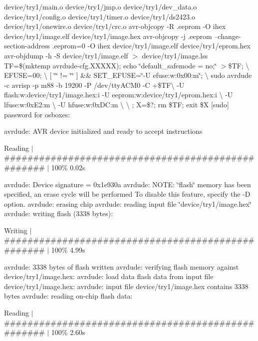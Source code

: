 device/try1/main.\-o device/try1/jmp.\-o device/try1/dev\-\_\-data.\-o device/try1/config.\-o device/try1/timer.\-o device/try1/ds2423.\-o device/try1/onewire.\-o device/try1/crc.\-o avr-\/objcopy -\/\-R .eeprom -\/\-O ihex device/try1/image.\-elf device/try1/image.\-hex avr-\/objcopy -\/j .eeprom --change-\/section-\/address .eeprom=0 -\/\-O ihex device/try1/image.\-elf device/try1/eprom.\-hex avr-\/objdump -\/h -\/\-S device/try1/image.\-elf $>$ device/try1/image.\-lss T\-F=\$(mktemp avrdude-\/cfg.\-X\-X\-X\-X\-X); echo \char`\"{}default\-\_\-safemode = no;\char`\"{} $>$\$\-T\-F; \textbackslash{} E\-F\-U\-S\-E=00; \textbackslash{} \mbox{[} \char`\"{}\char`\"{} != \char`\"{}\char`\"{} \mbox{]} \&\& S\-E\-T\-\_\-\-E\-F\-U\-S\-E=\char`\"{}-\/\-U efuse\-:w\-:0x00\-:m\char`\"{}; \textbackslash{} sudo avrdude -\/c avrisp -\/p m88 -\/b 19200 -\/\-P /dev/tty\-A\-C\-M0 -\/\-C +\$\-T\-F\textbackslash{} -\/\-U flash\-:w\-:device/try1/image.\-hex\-:i -\/\-U eeprom\-:w\-:device/try1/eprom.\-hex\-:i \textbackslash{} -\/\-U lfuse\-:w\-:0x\-E2\-:m \textbackslash{} -\/\-U hfuse\-:w\-:0x\-D\-C\-:m \textbackslash{} \textbackslash{} ; X=\$?; rm \$\-T\-F; exit \$\-X \mbox{[}sudo\mbox{]} password for osboxes\-:

avrdude\-: A\-V\-R device initialized and ready to accept instructions

Reading $\vert$ \#\#\#\#\#\#\#\#\#\#\#\#\#\#\#\#\#\#\#\#\#\#\#\#\#\#\#\#\#\#\#\#\#\#\#\#\#\#\#\#\#\#\#\#\#\#\#\#\#\# $\vert$ 100\% 0.\-02s

avrdude\-: Device signature = 0x1e930a avrdude\-: N\-O\-T\-E\-: \char`\"{}flash\char`\"{} memory has been specified, an erase cycle will be performed To disable this feature, specify the -\/\-D option. avrdude\-: erasing chip avrdude\-: reading input file \char`\"{}device/try1/image.\-hex\char`\"{} avrdude\-: writing flash (3338 bytes)\-:

Writing $\vert$ \#\#\#\#\#\#\#\#\#\#\#\#\#\#\#\#\#\#\#\#\#\#\#\#\#\#\#\#\#\#\#\#\#\#\#\#\#\#\#\#\#\#\#\#\#\#\#\#\#\# $\vert$ 100\% 4.\-99s

avrdude\-: 3338 bytes of flash written avrdude\-: verifying flash memory against device/try1/image.\-hex\-: avrdude\-: load data flash data from input file device/try1/image.\-hex\-: avrdude\-: input file device/try1/image.\-hex contains 3338 bytes avrdude\-: reading on-\/chip flash data\-:

Reading $\vert$ \#\#\#\#\#\#\#\#\#\#\#\#\#\#\#\#\#\#\#\#\#\#\#\#\#\#\#\#\#\#\#\#\#\#\#\#\#\#\#\#\#\#\#\#\#\#\#\#\#\# $\vert$ 100\% 2.\-60s

